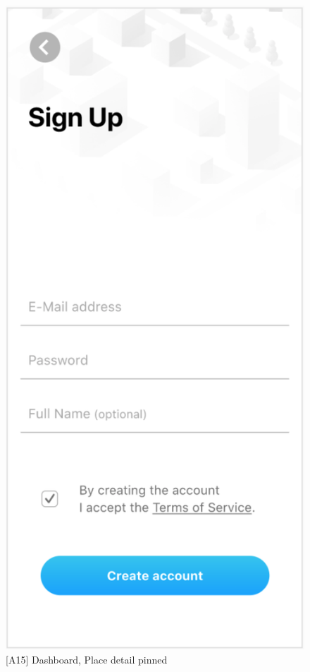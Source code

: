 \begin{figure}
\begin{minipage}{.45\textwidth}
        \includegraphics[width=.7\linewidth]{assets/user_interface_design/login/login_screen_sign_up.png}
        \caption{[A15] Dashboard, Place detail pinned}
        \label{fig:login_screen_sign_up}
    \end{minipage}
    \label{fig:login_screen_all}
\end{figure}
